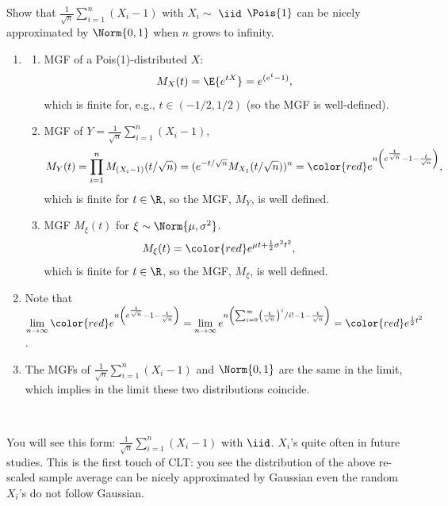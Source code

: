 \begin{exercise} 
	Show that $\frac{1}{\sqrt{n}}\sum_{i=1}^n (X_i-1)$ with $X_i\sim$ $\iid$ $\Pois{1}$ can be nicely approximated by $\Norm{0,1}$ when $n$ grows to infinity. 
	\begin{solution}
		\begin{enumerate} 
			\item 
			\begin{enumerate}
			\item {MGF of a Pois(1)-distributed $X$}: $$M_X(t)=\E{e^{tX}} =e^{(e^t-1)},$$ {which is finite for, e.g., $t\in (-1/2, 1/2)$ (so the MGF is well-defined)}.\\
			\item MGF of $Y=\frac{1}{\sqrt{n}}\sum_{i=1}^n (X_i-1),$
			\begin{align*}
				M_{Y}(t)= \prod_{i=1}^{n}M_{(X_i-1)}(t/\sqrt{n}) =(e^{-t/\sqrt{n}} M_{X_1}(t/\sqrt{n}))^n = {\color{red}e^{n\left(e^{\frac{t}{\sqrt{n}}}-1-\frac{t}{\sqrt{n}}\right)}}, 
			\end{align*} {which is finite for $t\in \R$, so the MGF,  $M_Y$, is well defined.} 
			\item {MGF $M_\xi(t)$ for $\xi \sim \Norm{\mu,\sigma^2}$.}
			\begin{align*}
				{ M_\xi(t)}& =  {\color{red}e^{\mu t + \frac{1}{2}\sigma^2 t^2}}, 
			\end{align*}  {which is finite for $t\in \R$, so the MGF,  $M_\xi$, is well defined.} 
		\end{enumerate}
		\item Note that $\lim\limits_{n\rightarrow \infty }{\color{red}e^{n\left(e^{\frac{t}{\sqrt{n}}}-1-\frac{t}{\sqrt{n}}\right)}}= \lim\limits_{n\rightarrow \infty}{e^{n\left(\sum_{i=0}^{\infty}\left(\frac{t}{\sqrt{n}} \right)^i/i!   -1-\frac{t}{\sqrt{n}}\right)}}=  {\color{red}e^{\frac{1}{2}t^2}}$.
		\item{The MGFs of $\frac{1}{\sqrt{n}}\sum_{i=1}^n (X_i-1)$ and $\Norm{0,1}$ are the same in the limit}, which implies in the limit these two distributions coincide.
	\end{enumerate}~\\
	\end{solution}
\end{exercise}

\begin{remark}
	You will see this form:
	 $\frac{1}{\sqrt{n}}\sum_{i=1}^n (X_i-1)$ with $\iid$. $X_i$'s quite often in future studies. This is the first touch of CLT: you see the distribution of the above re-scaled sample average can be nicely approximated by Gaussian even the random $X_i$'s do not follow Gaussian.\end{remark}


